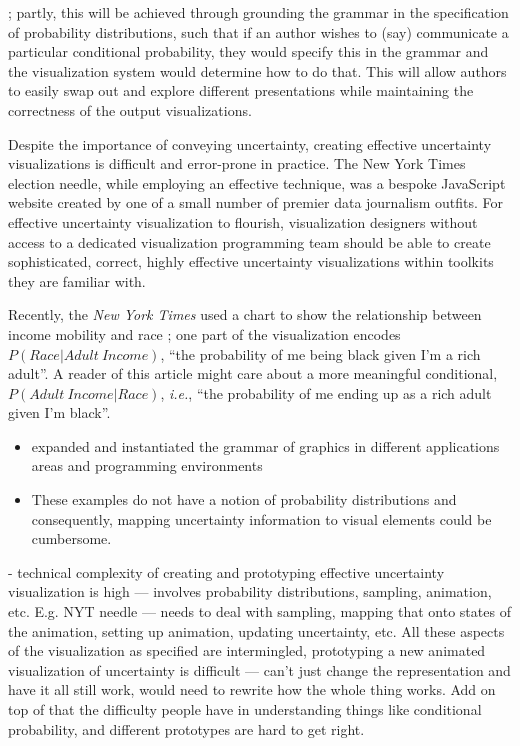 \documentclass[11pt]{article}
\begin{document}
; partly, this will be achieved through grounding the grammar in the specification of probability distributions, such that if an author wishes to (say) communicate a particular conditional probability, they would specify this in the grammar and the visualization system would determine how to do that. This will allow authors to easily swap out and explore different presentations while maintaining the correctness of the output visualizations.



Despite the importance of conveying uncertainty, creating effective uncertainty visualizations is difficult and error-prone in practice. The New York Times election needle, while employing an effective technique, was a bespoke JavaScript website created by one of a small number of premier data journalism outfits. For effective uncertainty visualization to flourish, visualization designers without access to a dedicated visualization programming team should be able to create sophisticated, correct, highly effective uncertainty visualizations within toolkits they are familiar with.



Recently, the \textit{New York Times} used a chart to show the relationship between income mobility and race \cite{emily_badger_income_2018}; one part of the visualization encodes $P(Race \vert Adult\ Income)$, ``the probability of me being black given I'm a rich adult''. A reader of this article might care about a more meaningful conditional, $P({Adult\ Income \vert Race })$, \textit{i.e.}, ``the probability of me ending up as a rich adult given I'm black''. 




\begin{itemize}
    \item expanded and instantiated the grammar of graphics in different applications areas and programming environments \cite{Park2017,Satyanarayan2017vegalite, Wickham2010layered_grammar, yin_ggbio_2012} %
    \item These examples do not have a notion of probability distributions and consequently, mapping uncertainty information to visual elements could be cumbersome.
\end{itemize}

- technical complexity of creating and prototyping effective uncertainty visualization is high --- involves probability distributions, sampling, animation, etc. E.g. NYT needle --- needs to deal with sampling, mapping that onto states of the animation, setting up animation, updating uncertainty, etc. All these aspects of the visualization as specified are intermingled, prototyping a new animated visualization of uncertainty is difficult --- can't just change the representation and have it all still work, would need to rewrite how the whole thing works. Add on top of that the difficulty people have in understanding things like conditional probability, and different prototypes are hard to get right. 
\end{document}
